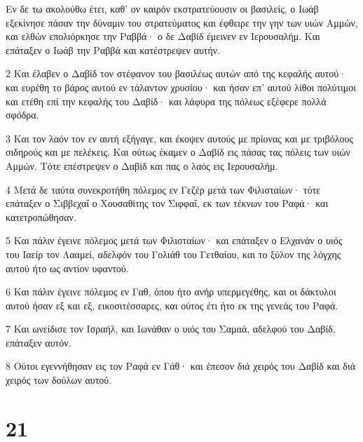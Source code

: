 \par Εν δε τω ακολούθω έτει, καθ' ον καιρόν εκστρατεύουσιν οι βασιλείς, ο Ιωάβ εξεκίνησε πάσαν την δύναμιν του στρατεύματος και έφθειρε την γην των υιών Αμμών, και ελθών επολιόρκησε την Ραββά· ο δε Δαβίδ έμεινεν εν Ιερουσαλήμ. Και επάταξεν ο Ιωάβ την Ραββά και κατέστρεψεν αυτήν.
\par 2 Και έλαβεν ο Δαβίδ τον στέφανον του βασιλέως αυτών από της κεφαλής αυτού· και ευρέθη το βάρος αυτού εν τάλαντον χρυσίου· και ήσαν επ' αυτού λίθοι πολύτιμοι και ετέθη επί την κεφαλής του Δαβίδ· και λάφυρα της πόλεως εξέφερε πολλά σφόδρα.
\par 3 Και τον λαόν τον εν αυτή εξήγαγε, και έκοψεν αυτούς με πρίονας και με τριβόλους σιδηρούς και με πελέκεις. Και ούτως έκαμεν ο Δαβίδ εις πάσας τας πόλεις των υιών Αμμών. Τότε επέστρεψεν ο Δαβίδ και πας ο λαός εις Ιερουσαλήμ.
\par 4 Μετά δε ταύτα συνεκροτήθη πόλεμος εν Γεζέρ μετά των Φιλισταίων· τότε επάταξεν ο Σιββεχαΐ ο Χουσαθίτης τον Σιφφαΐ, εκ των τέκνων του Ραφά· και κατετροπώθησαν.
\par 5 Και πάλιν έγεινε πόλεμος μετά των Φιλισταίων· και επάταξεν ο Ελχανάν ο υιός του Ιαείρ τον Λααμεί, αδελφόν του Γολιάθ του Γετθαίου, και το ξύλον της λόγχης αυτού ήτο ως αντίον υφαντού.
\par 6 Και πάλιν έγεινε πόλεμος εν Γαθ, όπου ήτο ανήρ υπερμεγέθης, και οι δάκτυλοι αυτού ήσαν εξ και εξ, εικοσιτέσσαρες, και ούτος έτι ήτο εκ της γενεάς του Ραφά.
\par 7 Και ωνείδισε τον Ισραήλ, και Ιωνάθαν ο υιός του Σαμαά, αδελφού του Δαβίδ, επάταξεν αυτόν.
\par 8 Ούτοι εγεννήθησαν εις τον Ραφά εν Γάθ· και έπεσον διά χειρός του Δαβίδ και διά χειρός των δούλων αυτού.

\chapter{21}

